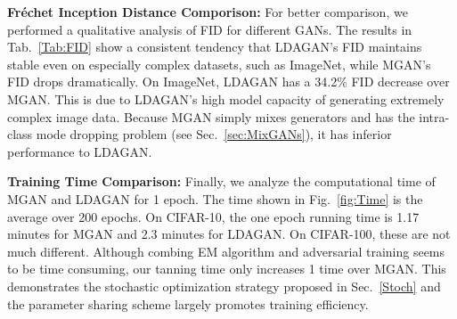 \documentclass{article}
\begin{document}
\begin{table*}[h]
\caption{Fr\'{e}chet Inception Distance on different datasets.}
\label{Tab:FID}
\centering
{}
\end{table*}


\noindent\textbf{Fr\'{e}chet Inception Distance Comporison:} For better comparison, we performed a qualitative analysis of FID for different GANs.
The results in Tab.~\ref{Tab:FID} show a consistent tendency that LDAGAN's FID maintains stable even on especially complex datasets, such as ImageNet, while MGAN's FID drops dramatically.
On ImageNet, LDAGAN has a 34.2\% FID decrease over MGAN.
This is due to LDAGAN's high model capacity of generating extremely complex image data.
Because MGAN simply mixes generators and has the intra-class mode dropping problem (see Sec.~\ref{sec:MixGANs}), it has inferior performance to LDAGAN.



\noindent\textbf{Training Time Comparison:}
Finally, we analyze the computational time of MGAN and LDAGAN for 1 epoch.
The time shown in Fig.~\ref{fig:Time} is the average over 200 epochs.
On CIFAR-10, the one epoch running time is 1.17 minutes for MGAN and 2.3 minutes for LDAGAN.
On CIFAR-100, these are not much different.
Although combing EM algorithm and adversarial training seems to be time consuming, our tanning time only increases 1 time over MGAN.
This demonstrates the stochastic optimization strategy proposed in Sec.~\ref{Stoch} and the parameter sharing scheme largely promotes training efficiency.
\end{document}
